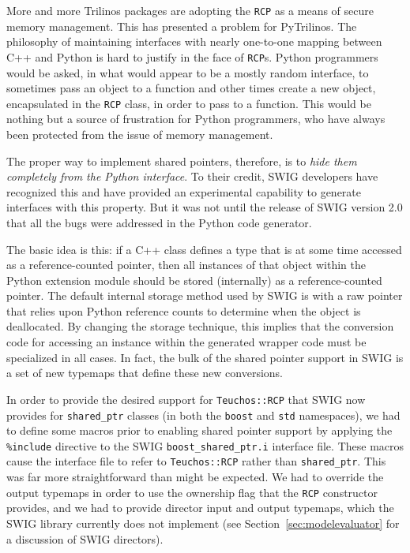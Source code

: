 \documentclass[11pt]{article}
\begin{document}
More and more Trilinos packages are adopting the {\tt RCP} as a means of secure memory management.  This has presented a problem for PyTrilinos.  The philosophy of maintaining interfaces with nearly one-to-one mapping between C++ and Python is hard to justify in the face of {\tt RCP}s.  Python programmers would be asked, in what would appear to be a mostly random interface, to sometimes pass an object to a function and other times create a new object, encapsulated in the {\tt RCP} class, in order to pass to a function.  This would be nothing but a source of frustration for Python programmers, who have always been protected from the issue of memory management.

The proper way to implement shared pointers, therefore, is to {\em hide them completely from the Python interface}.  To their credit, SWIG developers have recognized this and have provided an experimental capability to generate interfaces with this property.  But it was not until the release of SWIG version 2.0 that all the bugs were addressed in the Python code generator.

The basic idea is this: if a C++ class defines a type that is at some time accessed as a reference-counted pointer, then all instances of that object within the Python extension module should be stored (internally) as a reference-counted pointer.  The default internal storage method used by SWIG is with a raw pointer that relies upon Python reference counts to determine when the object is deallocated.  By changing the storage technique, this implies that the conversion code for accessing an instance within the generated wrapper code must be specialized in all cases.  In fact, the bulk of the shared pointer support in SWIG is a set of new typemaps that define these new conversions.

In order to provide the desired support for {\tt Teuchos::RCP} that SWIG now provides for {\tt shared\_ptr} classes (in both the {\tt boost} and {\tt std} namespaces), we had to define some macros prior to enabling shared pointer support by applying the {\tt \%include} directive to the SWIG {\tt boost\_shared\_ptr.i} interface file. These macros cause the interface file to refer to {\tt Teuchos::RCP} rather than {\tt shared\_ptr}.  This was far more straightforward than might be expected.  We had to override the output typemaps in order to use the ownership flag that the {\tt RCP} constructor provides, and we had to provide director input and output typemaps, which the SWIG library currently does not implement (see Section~\ref{sec:modelevaluator} for a discussion of SWIG directors).
\end{document}
